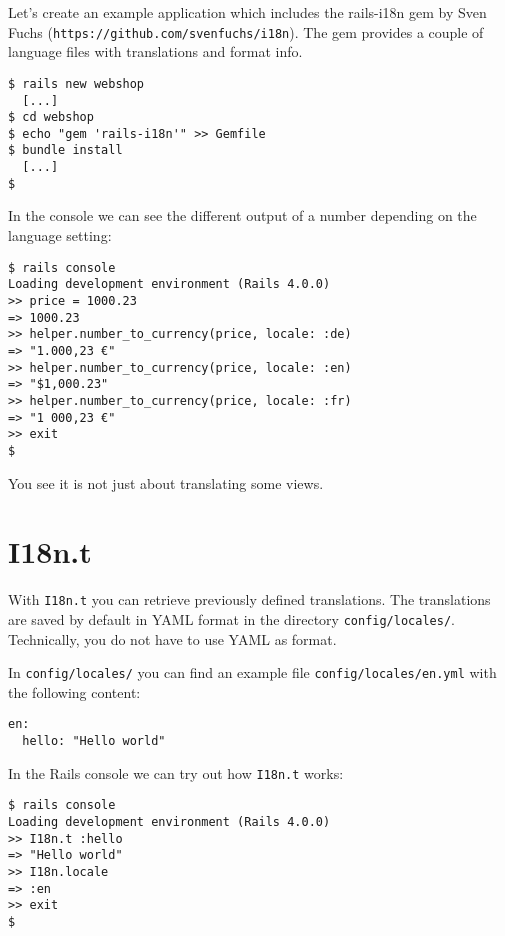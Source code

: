 \documentclass[a4paper]{book}
\newcommand{\chap}[1]{\newpage\thispagestyle{empty}\chapter{#1}\label{chap:\thechapter}}
\begin{document}
Let's create an example application which includes the rails-i18n gem by Sven Fuchs (\texttt{https://github.com/svenfuchs/i18n}). The gem provides a couple of language files with translations and format info.

\begin{shaded}\begin{verbatim}
$ rails new webshop
  [...]
$ cd webshop
$ echo "gem 'rails-i18n'" >> Gemfile
$ bundle install
  [...]
$
\end{verbatim}\end{shaded}

In the console we can see the different output of a number depending on the language setting:

\begin{shaded}\begin{verbatim}
$ rails console
Loading development environment (Rails 4.0.0)
>> price = 1000.23
=> 1000.23
>> helper.number_to_currency(price, locale: :de)
=> "1.000,23 €"
>> helper.number_to_currency(price, locale: :en)
=> "$1,000.23"
>> helper.number_to_currency(price, locale: :fr)
=> "1 000,23 €"
>> exit
$
\end{verbatim}\end{shaded}

You see it is not just about translating some views.

\chap{I18n.t}\label{i18n.t}

With \texttt{I18n.t} you can retrieve previously defined translations. The translations are saved by default in YAML format in the directory \texttt{config/locales/}. Technically, you do not have to use YAML as format.

In \texttt{config/locales/} you can find an example file \texttt{config/locales/en.yml} with the following content:

\begin{shaded}\begin{verbatim}
en:
  hello: "Hello world"
\end{verbatim}\end{shaded}

In the Rails console we can try out how \texttt{I18n.t} works:

\begin{shaded}\begin{verbatim}
$ rails console
Loading development environment (Rails 4.0.0)
>> I18n.t :hello
=> "Hello world"
>> I18n.locale
=> :en
>> exit
$
\end{verbatim}\end{shaded}
\end{document}
